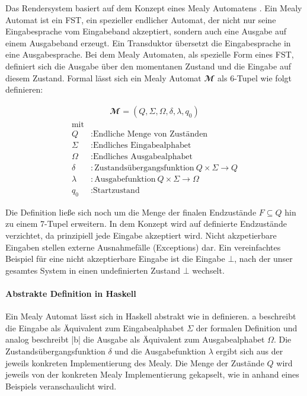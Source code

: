 Das Rendersystem basiert auf dem Konzept eines Mealy Automatens \parencite{Mealy1955}. Ein Mealy Automat ist ein \acl{FST}, ein spezieller endlicher Automat, der nicht nur seine Eingabesprache vom Eingabeband akzeptiert, sondern auch eine Ausgabe auf einem Ausgabeband erzeugt. Ein Transduktor übersetzt die Eingabesprache in eine Ausgabesprache. Bei dem Mealy Automaten, als spezielle Form eines \ac{FST}, definiert sich die Ausgabe über den momentanen Zustand und die Eingabe auf diesem Zustand. Formal lässt sich ein Mealy Automat $\mathbfcal{M}$ als 6-Tupel wie folgt definieren:

\begin{definition}
\begin{align}
\mathbfcal{M} = \left( Q, \Sigma, \Omega, \delta, \lambda, q_0 \right)
\label{def:mealy-formal}
\end{align}
\begin{align*}
	\text{mit}\\
	Q &: \text{Endliche Menge von Zuständen} \\
	\Sigma  &:\text{Endliches Eingabealphabet} \\
	\Omega  &:\text{Endliches Ausgabealphabet} \\
	\delta  &:\text{Zustandsübergangsfunktion}\ Q \times \Sigma \rightarrow Q \\
	\lambda &:\text{Ausgabefunktion}\ Q \times \Sigma \rightarrow \Omega \\
	q_0 &: \text{Startzustand}
\end{align*}
\end{definition}

Die Definition ließe sich noch um die Menge der finalen Endzustände $F \subseteq Q$ hin zu einem 7-Tupel erweitern. In dem Konzept wird auf definierte Endzustände verzichtet, da prinzipiell jede Eingabe akzeptiert wird. Nicht akzpetierbare Eingaben stellen externe Ausnahmefälle (Exceptions) dar. Ein vereinfachtes Beispiel für eine nicht akzeptierbare Eingabe ist die Eingabe $\bot$, nach der unser gesamtes System in einen undefinierten Zustand $\bot$ wechselt.

\paragraph{Abstrakte Definition in Haskell}
\label{sec:abstrakte-definition-haskell}

Ein Mealy Automat lässt sich in Haskell abstrakt wie in  definieren. {\ttfamily a} beschreibt die Eingabe als Äquivalent zum Eingabealphabet $\Sigma$ der formalen Definition und analog beschreibt |b| die Ausgabe als Äquivalent zum Ausgabealphabet $\Omega$. Die Zustandsübergangsfunktion $\delta$ und die Ausgabefunktion $\lambda$ ergibt sich aus der jeweils konkreten Implementierung des Mealy. Die Menge der Zustände $Q$ wird jeweils von der konkreten Mealy Implementierung gekapselt, wie in  anhand eines Beispiels veranschaulicht wird.

